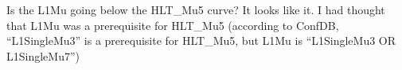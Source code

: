 \documentclass[compress]{beamer}
\begin{document}
\begin{frame}


\vfill Is the L1Mu going below the HLT\_Mu5 curve?  It looks like it.
I had thought that L1Mu was a prerequisite for HLT\_Mu5 {\small
  (according to ConfDB, ``L1SingleMu3'' is a prerequisite for HLT\_Mu5, but L1Mu is
  ``L1SingleMu3 OR L1SingleMu7'')}
\end{frame}
\end{document}
